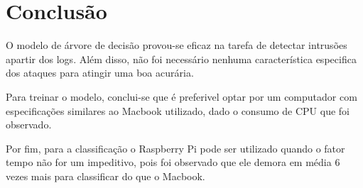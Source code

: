 
\chapter{Conclusão}
\label{cap:conclusao}

O modelo de árvore de decisão provou-se eficaz na tarefa de detectar intrusões
apartir dos logs. Além disso, não foi necessário nenhuma característica especifica
dos ataques para atingir uma boa acurária.

Para treinar o modelo, conclui-se que é preferivel optar por um computador com 
especificações similares ao Macbook utilizado, dado o consumo de CPU que foi
observado.

Por fim, para a classificação o Raspberry Pi pode ser utilizado quando o fator 
tempo não for um impeditivo, pois foi observado que ele demora em média 6 vezes 
mais para classificar do que o Macbook.